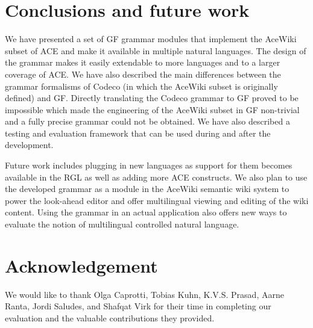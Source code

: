 \documentclass[a4paper]{article}
\begin{document}
\section{Conclusions and future work}
\label{section:Conclusions}

We have presented a set of GF grammar modules that implement the AceWiki
subset of ACE and make it available in multiple natural languages. The design
of the grammar makes it easily extendable to more languages and to a larger
coverage of ACE.
We have also described the main differences between the grammar formalisms
of Codeco (in which the AceWiki subset is originally defined) and GF. Directly
translating the Codeco grammar to GF proved to be impossible which made the
engineering of the AceWiki subset in GF non-trivial and a fully
precise grammar could not be obtained.
We have also described a testing and evaluation framework that can be used
during and after the development.

Future work includes plugging in new languages as support for them becomes
available in the RGL as well as adding more ACE constructs. We also plan
to use the developed grammar as a module in the AceWiki semantic wiki system
to power the look-ahead editor and offer multilingual viewing and editing
of the wiki content. Using the grammar in an actual application also offers
new ways to evaluate the notion of multilingual controlled natural language.

\section*{Acknowledgement}

We would like to thank
Olga Caprotti,
Tobias Kuhn,
K.V.S. Prasad,
Aarne Ranta,
Jordi Saludes,
and
Shafqat Virk
for their time in completing our
evaluation and the valuable contributions they provided.



%
\end{document}
